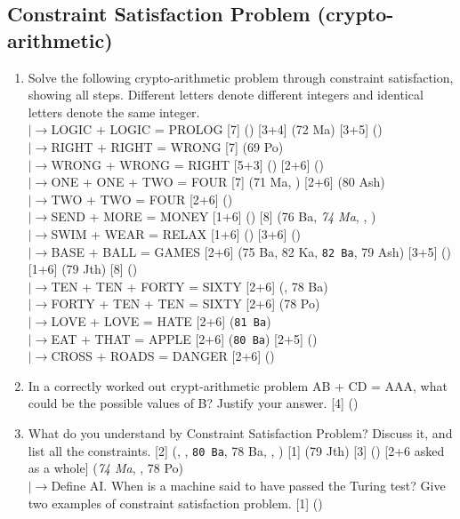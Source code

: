 \documentclass[12pt]{article}
\newcommand{\lb}{\\$\left|\rightarrow\right.$}
\begin{document}
  \subsection{Constraint Satisfaction Problem (crypto-arithmetic)}
    \begin{enumerate}[topsep=0pt, noitemsep]
      \item Solve the following crypto-arithmetic problem through constraint satisfaction, showing all steps. Different letters denote different integers and identical letters denote the same integer.
        \lb LOGIC + LOGIC = PROLOG \hfill [7] () [3+4] (72 Ma) [3+5] ()
        \lb RIGHT + RIGHT = WRONG \hfill [7] (69 Po)
        \lb WRONG + WRONG = RIGHT \hfill [5+3] () [2+6] ()
        \lb ONE + ONE + TWO = FOUR \hfill [7] (71 Ma, ) [2+6] (80 Ash)
        \lb TWO + TWO = FOUR \hfill [2+6] ()
        \lb SEND + MORE = MONEY \hfill [1+6] () [8] (76 Ba, \textit{74 Ma}, , )
        \lb SWIM + WEAR = RELAX \hfill [1+6] () [3+6] ()
        \lb BASE + BALL = GAMES \hfill [2+6] (75 Ba, 82 Ka, \texttt{82 Ba}, 79 Ash) [3+5] () [1+6] (79 Jth) [8] ()
        \lb TEN + TEN + FORTY = SIXTY \hfill [2+6] (, 78 Ba)
        \lb FORTY + TEN + TEN = SIXTY \hfill [2+6] (78 Po)
        \lb LOVE + LOVE = HATE \hfill [2+6] (\texttt{81 Ba})
        \lb EAT + THAT = APPLE \hfill [2+6] (\texttt{80 Ba}) [2+5] ()
        \lb CROSS + ROADS = DANGER \hfill [2+6] ()

      \item In a correctly worked out crypt-arithmetic problem AB + CD = AAA, what could be the possible values of B? Justify your answer. \hfill [4] ()

      \item What do you understand by Constraint Satisfaction Problem? Discuss it, and list all the constraints. \hfill [2] (, , \texttt{80 Ba}, 78 Ba, , ) [1] (79 Jth) [3] () [2+6 asked as a whole] (\textit{74 Ma}, , 78 Po)
        \lb Define AI. When is a machine said to have passed the Turing test? Give two examples of constraint satisfaction problem. \hfill [1] ()
    \end{enumerate}
\end{document}
